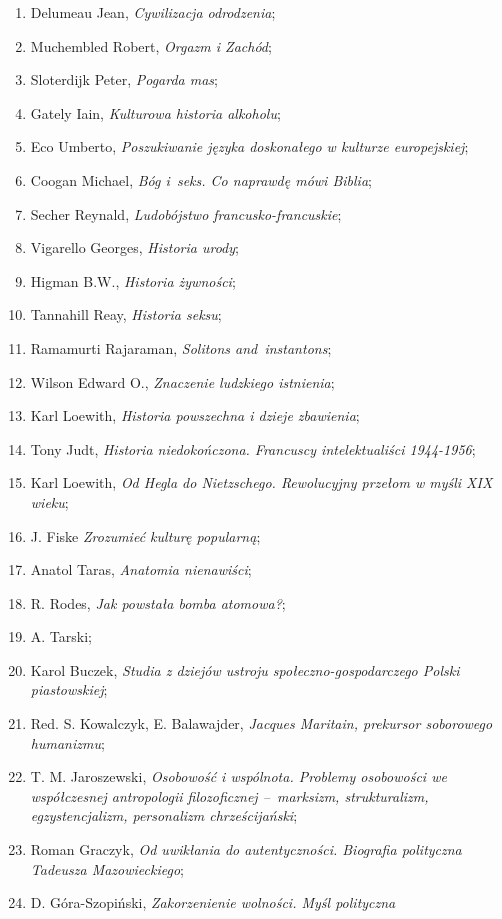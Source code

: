 \documentclass[a4paper,11pt]{article}
\begin{document}
\begin{enumerate}
\item Delumeau Jean, \emph{Cywilizacja odrodzenia};
\item Muchembled Robert, \emph{Orgazm i Zachód};
\item Sloterdijk Peter, \emph{Pogarda mas};
\item Gately Iain, \emph{Kulturowa historia alkoholu};
\item Eco Umberto, \emph{Poszukiwanie języka doskonałego w kulturze
    europejskiej};
\item Coogan Michael, \emph{Bóg i~seks. Co naprawdę mówi Biblia};
\item Secher Reynald, \emph{Ludobójstwo francusko-francuskie};
\item Vigarello Georges, \emph{Historia urody};
\item Higman B.W., \emph{Historia żywności};
\item Tannahill Reay, \emph{Historia seksu};
\item Ramamurti Rajaraman, \emph{Solitons and~instantons};
\item Wilson Edward O., \emph{Znaczenie ludzkiego istnienia};
\item Karl Loewith, \emph{Historia powszechna i dzieje zbawienia};
\item Tony Judt, \emph{Historia niedokończona. Francuscy
    intelektualiści 1944-1956};
\item Karl Loewith, \emph{Od Hegla do Nietzschego. Rewolucyjny przełom
    w myśli XIX wieku};
\item J. Fiske \emph{Zrozumieć kulturę popularną};
\item Anatol Taras, \emph{Anatomia nienawiści};
\item R. Rodes, \emph{Jak powstała bomba atomowa?};
\item A. Tarski;
\item Karol Buczek, \emph{Studia z dziejów ustroju
    społeczno-gospodarczego Polski piastowskiej};
\item Red. S. Kowalczyk, E. Balawajder, \emph{Jacques Maritain,
    prekursor soborowego humanizmu};
\item T. M. Jaroszewski, \emph{Osobowość i wspólnota. Problemy
    osobowości we współczesnej antropologii filozoficznej --~marksizm,
    strukturalizm, egzystencjalizm, personalizm chrześcijański};
\item Roman Graczyk, \emph{Od uwikłania do autentyczności. Biografia
    polityczna Tadeusza Mazowieckiego};
\item D. Góra-Szopiński, \emph{Zakorzenienie wolności. Myśl polityczna
}
\end{enumerate}
\end{document}
